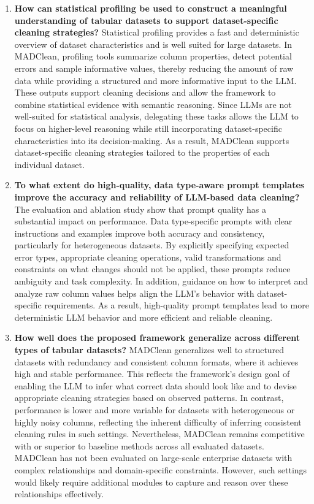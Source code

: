\begin{enumerate}
    \item \textbf{How can statistical profiling be used to construct a meaningful understanding of tabular datasets to support dataset-specific cleaning strategies?}
    \newline
    Statistical profiling provides a fast and deterministic overview of dataset characteristics and is well suited for large datasets. 
    In MADClean, profiling tools summarize column properties, detect potential errors and sample informative values, thereby reducing the amount of raw data while providing a structured and more informative input to the LLM. 
    These outputs support cleaning decisions and allow the framework to combine statistical evidence with semantic reasoning. 
    Since LLMs are not well-suited for statistical analysis, delegating these tasks allows the LLM to focus on higher-level reasoning while still incorporating dataset-specific characteristics into its decision-making. 
    As a result, MADClean supports dataset-specific cleaning strategies tailored to the properties of each individual dataset.
    \item \textbf{To what extent do high-quality, data type-aware prompt templates improve the accuracy and reliability of LLM-based data cleaning?}
    \newline
    The evaluation and ablation study show that prompt quality has a substantial impact on performance. 
    Data type-specific prompts with clear instructions and examples improve both accuracy and consistency, particularly for heterogeneous datasets. 
    By explicitly specifying expected error types, appropriate cleaning operations, valid transformations and constraints on what changes should not be applied, these prompts reduce ambiguity and task complexity.  
    In addition, guidance on how to interpret and analyze raw column values helps align the LLM's behavior with dataset-specific requirements. 
    As a result, high-quality prompt templates lead to more deterministic LLM behavior and more efficient and reliable cleaning.
    \item \textbf{How well does the proposed framework generalize across different types of tabular datasets?}
    \newline
    MADClean generalizes well to structured datasets with redundancy and consistent column formats, where it achieves high and stable performance. 
    This reflects the framework's design goal of enabling the LLM to infer what correct data should look like and to devise appropriate cleaning strategies based on observed patterns.
    In contrast, performance is lower and more variable for datasets with heterogeneous or highly noisy columns, reflecting the inherent difficulty of inferring consistent cleaning rules in such settings. 
    Nevertheless, MADClean remains competitive with or superior to baseline methods across all evaluated datasets.
    MADClean has not been evaluated on large-scale enterprise datasets with complex relationships and domain-specific constraints. 
    However, such settings would likely require additional modules to capture and reason over these relationships effectively.
\end{enumerate}

